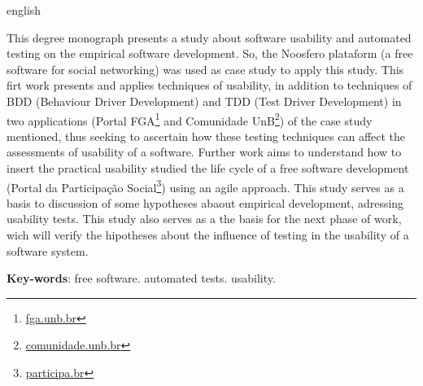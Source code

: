\begin{resumo}[Abstract]
  \begin{otherlanguage*}{english}  
  
This degree monograph presents a study about software usability and automated testing on the empirical software development. So, the Noosfero plataform (a free software for social networking) was used as case study to apply this study. This firt work presents and applies techniques of usability, in addition to techniques of BDD (Behaviour Driver Development) and TDD (Test Driver Development) in two applications (Portal FGA\footnote{\url{fga.unb.br}} and Comunidade UnB\footnote{\url{comunidade.unb.br}}) of the case study mentioned, thus seeking to ascertain how these testing techniques can affect the assessments of usability of a software. Further work aims to understand how to insert the practical usability studied the life cycle of a free software development (Portal da Participação Social\footnote{\url{participa.br}})  using an agile approach. This study serves as a basis to discussion of some hypotheses abaout empirical development, adressing usability tests. This study also serves as a the basis for the next phase of work, wich will verify the hipotheses about the influence of testing in the usability of a software system.

 
   \vspace{\onelineskip}
 
  \noindent 
  \textbf{Key-words}: free software. automated tests. usability.
  \end{otherlanguage*}
\end{resumo}
